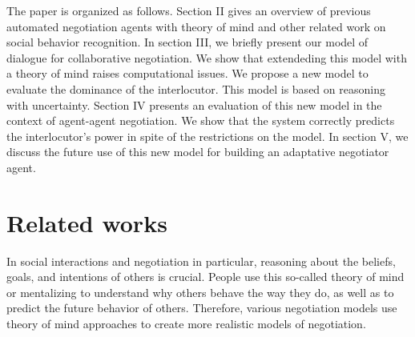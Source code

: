 \documentclass[sigconf]{aamas}  %
\begin{document}
%	
%	
%	
%	
%	
%	
%	
	The paper is organized as follows. Section II gives an overview of previous automated negotiation agents with theory of mind and other related work on social behavior recognition. In section III, we briefly present our model of dialogue for collaborative negotiation. We show that extendeding this model with a theory of mind raises computational issues. We propose a new model to evaluate the dominance of the interlocutor. This model is based on reasoning with uncertainty. Section IV presents an evaluation of this new model in the context of agent-agent negotiation. We show that the system correctly predicts the interlocutor's power in spite of the restrictions on the model. In section V, we discuss the future use of this new model for building an adaptative negotiator agent.
	
	
	\section{Related works}
	
	In social interactions and negotiation in particular, reasoning about the beliefs, goals, and intentions of others is crucial. People use this so-called theory of mind \cite{premack1978does} or mentalizing to understand why others behave the way they do, as well as to predict the future behavior of others. Therefore, various negotiation models use theory of mind approaches to create  more realistic models of negotiation. 
	
\end{document}
